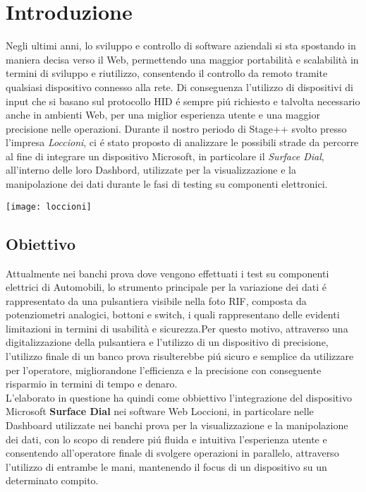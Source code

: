 \chapter{Introduzione}
\label{chap:intro}

Negli ultimi anni, lo sviluppo e controllo di software aziendali si sta spostando in maniera decisa verso il Web, permettendo una maggior portabilità e scalabilità in termini di sviluppo e riutilizzo, consentendo il controllo da remoto tramite qualsiasi dispositivo connesso alla rete. Di conseguenza l’utilizzo di dispositivi di input che si basano sul protocollo HID é sempre piú richiesto e talvolta necessario anche in ambienti Web, per una miglior esperienza utente e una maggior precisione nelle operazioni.
Durante il nostro periodo di Stage++ svolto presso l'impresa \emph{Loccioni}, ci é stato proposto di analizzare le possibili strade da percorre al fine di integrare un dispositivo Microsoft, in particolare il \emph{Surface Dial}, all'interno delle loro Dashbord, utilizzate per la visualizzazione e la manipolazione dei dati durante le fasi di testing su componenti elettronici.
\begin{center}
\texttt{[image: loccioni]}
\end{center}

\newpage
\section{Obiettivo}
Attualmente nei banchi prova dove vengono effettuati i test su componenti elettrici di Automobili, lo strumento principale per la variazione dei dati é rappresentato da una pulsantiera visibile nella foto RIF, composta da potenziometri analogici, bottoni e switch, i quali rappresentano delle evidenti limitazioni in termini  di usabilità e sicurezza.Per questo motivo, attraverso una digitalizzazione della pulsantiera e l'utilizzo di un dispositivo di precisione, l'utilizzo finale di un banco prova risulterebbe piú sicuro e semplice da utilizzare per l'operatore, migliorandone l'efficienza e la precisione con conseguente risparmio in termini di tempo e denaro.\\

L'elaborato in questione ha quindi come obbiettivo l'integrazione del dispositivo Microsoft \textbf{Surface Dial} nei software Web Loccioni, in particolare nelle Dashboard utilizzate nei banchi prova per la visualizzazione e la manipolazione dei dati, con lo scopo di rendere piú fluida e intuitiva l'esperienza utente e consentendo all'operatore finale di svolgere operazioni in parallelo, attraverso l'utilizzo di entrambe le mani, mantenendo il focus di un dispositivo su un determinato compito.\\

